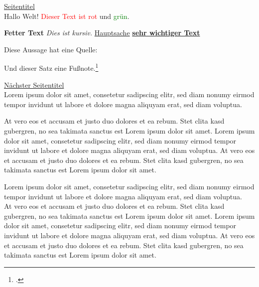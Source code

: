 \documentclass{article}
\newcommand{\pagetitle}[1]{\newpage\underline{#1}\\}
\begin{document}
\pagetitle{Seitentitel}

Hallo Welt!
\textcolor{red}{Dieser Text ist rot} und \textcolor{green}{grün}.

\textbf{Fetter Text}
\textit{Dies ist kursiv.}
\underline{Hauptsache}
\textbf{\underline{sehr wichtiger Text}}

Diese Aussage hat eine Quelle: \cite{DemoQuelle}

Und dieser Satz eine Fußnote.\footcite{DemoQuelle}



\pagetitle{Nächster Seitentitel}
Lorem ipsum dolor sit amet, consetetur sadipscing elitr, sed diam nonumy eirmod tempor invidunt ut labore et dolore magna aliquyam erat, sed diam voluptua.

At vero eos et accusam et justo duo dolores et ea rebum. Stet clita kasd gubergren, no sea takimata sanctus est Lorem ipsum dolor sit amet. Lorem ipsum dolor sit amet, consetetur sadipscing elitr, sed diam nonumy eirmod tempor invidunt ut labore et dolore magna aliquyam erat, sed diam voluptua. At vero eos et accusam et justo duo dolores et ea rebum. Stet clita kasd gubergren, no sea takimata sanctus est Lorem ipsum dolor sit amet.

Lorem ipsum dolor sit amet, consetetur sadipscing elitr, sed diam nonumy eirmod tempor invidunt ut labore et dolore magna aliquyam erat, sed diam voluptua.\\ At vero eos et accusam et justo duo dolores et ea rebum. Stet clita kasd gubergren, no sea takimata sanctus est Lorem ipsum dolor sit amet. Lorem ipsum dolor sit amet, consetetur sadipscing elitr, sed diam nonumy eirmod tempor invidunt ut labore et dolore magna aliquyam erat, sed diam voluptua. At vero eos et accusam et justo duo dolores et ea rebum. Stet clita kasd gubergren, no sea takimata sanctus est Lorem ipsum dolor sit amet.

\newpage
\printbibliography
\end{document}
